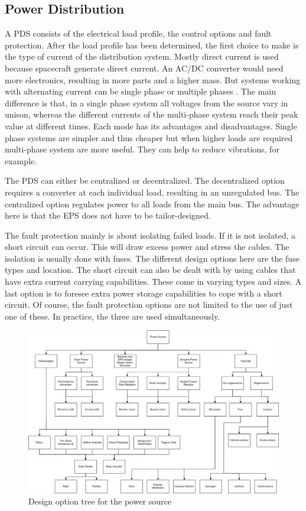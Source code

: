 \subsection{Power Distribution}
\label{blDOdistribution}

A \ac{PDS} consists of the electrical load profile, the control options and fault protection. After the load profile has been determined, the first choice to make is the type of current of the distribution system. Mostly direct current is used because spacecraft generate direct current. An AC/DC converter would need more electronics, resulting in more parts and a higher mass. But systems working with alternating current can be single phase or multiple phases \cite{kuphaldt}. The main difference is that, in a single phase system all voltages from the source vary in unison, whereas the different currents of the multi-phase system reach their peak value at different times. Each mode has its advantages and disadvantages. Single phase systems are simpler and thus cheaper but when higher loads are required multi-phase system are more useful. They can help to reduce vibrations, for example.

The PDS can either be centralized or decentralized. The decentralized option requires a converter at each individual load, resulting in an unregulated bus. The centralized option regulates power to all loads from the main bus. The advantage here is that the EPS does not have to be tailor-designed. 

The fault protection mainly is about isolating failed loads. If it is not isolated, a short circuit can occur. This will draw excess power and stress the cables. The isolation is usually done with fuses. The different design options here are the fuse types and location.
The short circuit can also be dealt with by using cables that have extra current carrying capabilities. These come in varying types and sizes.
A last option is to foresee extra power storage capabilities to cope with a short circuit.
Of course, the fault protection options are not limited to the use of just one of these. In practice, the three are used simultaneously.

\begin{figure}
\centering
\includegraphics[width=1.0\textwidth, angle=90]{chapters/img/DOTeps_source.jpg}
\caption{Design option tree for the power source}
\label{pic_DOTeps_source}
\end{figure}

